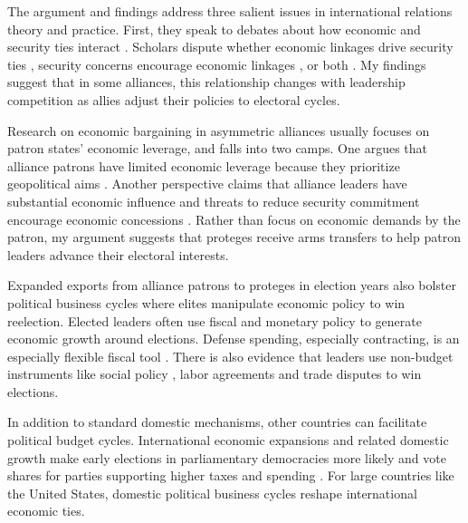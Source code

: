 \documentclass[12pt]{article}
\begin{document}
The argument and findings address three salient issues in international relations theory and practice. 
First, they speak to debates about how economic and security ties interact \citep{Mastanduno2009, Poast2019}. 
Scholars dispute whether economic linkages drive security ties \citep{BiglaiserDeRouen2007, Fordham2010, Kimball2010}, security concerns encourage economic linkages \citep{Gowa1995, Li2003, LongLeeds2006, GowaMansfield2004}, or both \citep{BiglaiserDeRouen2009, KinneBunte2018}. 
My findings suggest that in some alliances, this relationship changes with leadership competition as allies adjust their policies to electoral cycles.


Research on economic bargaining in asymmetric alliances usually focuses on patron states' economic leverage, and falls into two camps. 
One argues that alliance patrons have limited economic leverage because they prioritize geopolitical aims \citep{Drezner2013, WolfordKim2017}.
Another perspective claims that alliance leaders have substantial economic influence \citep{Norrlof2010, Brooksetal2013} and threats to reduce security commitment encourage economic concessions \citep[pg. 122]{Oatley2015}.
Rather than focus on economic demands by the patron, my argument suggests that proteges receive arms transfers to help patron leaders advance their electoral interests.


Expanded exports from alliance patrons to proteges in election years also bolster political business cycles where elites manipulate economic policy to win reelection. 
Elected leaders often use fiscal \citep{Rogoff1987} and monetary policy \citep{ClarkHallerberg2000} to generate economic growth around elections. 
Defense spending, especially contracting, is an especially flexible fiscal tool \citep{Tufte1978, Mintz1988, Mayer1995, DerouenHeo2000, Becker2021}.
There is also evidence that leaders use non-budget instruments like social policy \citep{Philips2020}, labor agreements \citep{Ahlquist2010} and trade disputes \citep{Conconietal2017} to win elections. 


In addition to standard domestic mechanisms, other countries can facilitate political budget cycles. 
International economic expansions and related domestic growth make early elections in parliamentary democracies more likely \citep{Kayser2006} and vote shares for parties supporting higher taxes and spending \citep{Kayser2009}.
For large countries like the United States, domestic political business cycles reshape international economic ties.
\end{document}
